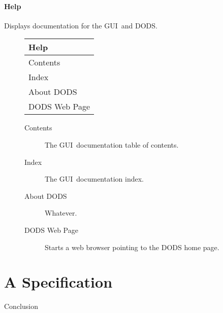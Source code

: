 \documentclass[10pt]{report}
\newcommand{\gui}{GUI}
\newcommand{\bigspace}{\vspace*{1.5in}}
\begin{document}
\subsubsection{Help}
\label{sec:menu:help}
Displays documentation for the \gui\ and DODS.
\begin{description}
\item[] 
  \begin{center}
    \begin{tabular}[c]{|l|} \hline
      \textbf{Help} \\ \hline
      Contents \\
      Index \\
      About DODS \\
      DODS Web Page \\ \hline
    \end{tabular}
  \end{center}
  \begin{description}
  \item[Contents] The \gui\ documentation table of contents.
  \item[Index] The \gui\ documentation index.
  \item[About DODS] Whatever.
  \item[DODS Web Page] Starts a web browser pointing to the DODS home
    page. 
  \end{description}
\end{description}

\chapter{A Specification}
\label{sec:spec}

Conclusion
\bigspace
\end{document}
